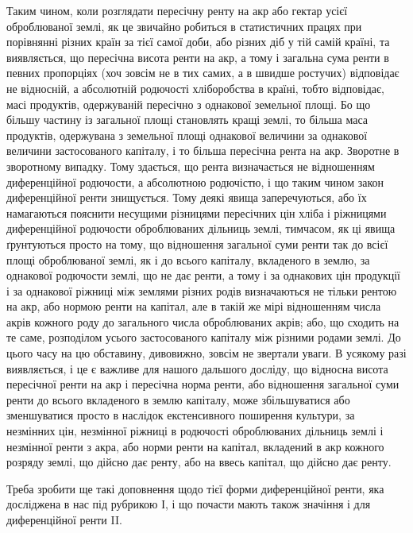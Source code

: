 Таким чином, коли розглядати пересічну ренту на акр або гектар усієї
оброблюваної землі, як це звичайно робиться в статистичних працях при порівнянні
різних країн за тієї самої доби, або різних діб у тій самій країні, та
виявляється, що пересічна висота ренти на акр, а тому і загальна сума ренти
в певних пропорціях (хоч зовсім не в тих самих, а в швидше ростучих) відповідає
не відносній, а абсолютній родючості хліборобства в країні, тобто відповідає,
масі продуктів, одержуваній пересічно з однакової земельної площі. Бо що
більшу частину із загальної площі становлять кращі землі, то більша маса
продуктів, одержувана з земельної площі однакової величини за однакової величини
застосованого капіталу, і то більша пересічна рента на акр. Зворотне в зворотному
випадку. Тому здається, що рента визначається не відношенням диференційної
родючости, а абсолютною родючістю, і що таким чином закон диференційної
ренти знищується. Тому деякі явища заперечуються, або їх намагаються
пояснити несущими різницями пересічних цін хліба і ріжницями диференційної
родючости оброблюваних дільниць землі, тимчасом, як ці явища ґрунтуються
просто на тому, що відношення загальної суми ренти так до всієї площі оброблюваної
землі, як і до всього капіталу, вкладеного в землю, за однакової родючости
землі, що не дає ренти, а тому і за однакових цін продукції і за
однакової ріжниці між землями різних родів визначаються не тільки рентою
на акр, або нормою ренти на капітал, але в такій же мірі відношенням числа
акрів кожного роду до загального числа оброблюваних акрів; або, що сходить
на те саме, розподілом усього застосованого капіталу між різними родами землі.
До цього часу на цю обставину, дивовижно, зовсім не звертали уваги. В усякому
разі виявляється, і це є важливе для нашого дальшого досліду, що відносна
висота пересічної ренти на акр і пересічна норма ренти, або відношення
загальної суми ренти до всього вкладеного в землю капіталу, може збільшуватися
або зменшуватися просто в наслідок екстенсивного поширення культури,
за незмінних цін, незмінної ріжниці в родючості оброблюваних дільниць землі
і незмінної ренти з акра, або норми ренти на капітал, вкладений в акр
кожного розряду землі, що дійсно дає ренту, або на ввесь капітал, що дійсно
дає ренту.

Треба зробити ще такі доповнення щодо тієї форми диференційної ренти,
яка досліджена в нас під рубрикою І, і що почасти мають також значіння і
для диференційної ренти II.

